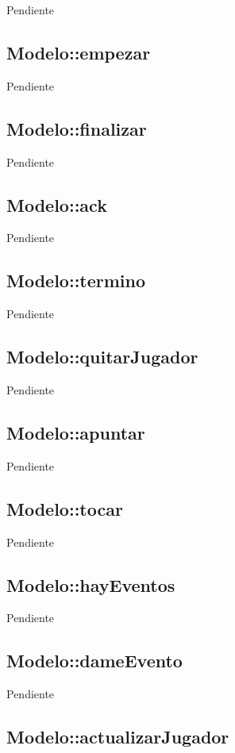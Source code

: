 \documentclass[a4paper,10pt,twoside]{article}
\begin{document}
Pendiente


\subsection{Modelo::empezar}

Pendiente


\subsection{Modelo::finalizar}

Pendiente


\subsection{Modelo::ack}

Pendiente


\subsection{Modelo::termino}

Pendiente


\subsection{Modelo::quitarJugador}

Pendiente


\subsection{Modelo::apuntar}

Pendiente


\subsection{Modelo::tocar}

Pendiente


\subsection{Modelo::hayEventos}

Pendiente


\subsection{Modelo::dameEvento}

Pendiente


\subsection{Modelo::actualizarJugador}
\end{document}
